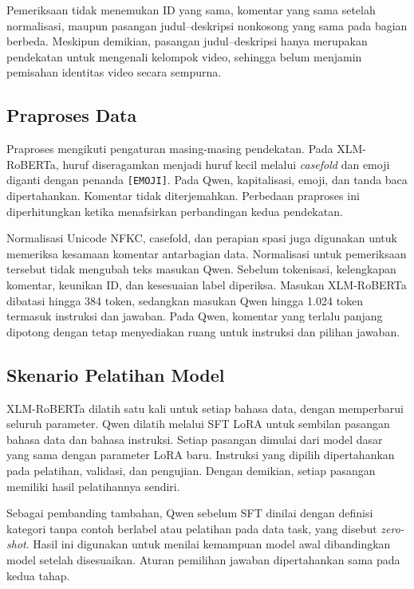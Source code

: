 \documentclass[11pt]{article}
\begin{document}
Pemeriksaan tidak menemukan ID yang sama, komentar yang sama setelah normalisasi, maupun pasangan judul--deskripsi nonkosong yang sama pada bagian berbeda. Meskipun demikian, pasangan judul--deskripsi hanya merupakan pendekatan untuk mengenali kelompok video, sehingga belum menjamin pemisahan identitas video secara sempurna.

\subsection{Praproses Data}
Praproses mengikuti pengaturan masing-masing pendekatan. Pada XLM-RoBERTa, huruf diseragamkan menjadi huruf kecil melalui \textit{casefold} dan emoji diganti dengan penanda \texttt{[EMOJI]}. Pada Qwen, kapitalisasi, emoji, dan tanda baca dipertahankan. Komentar tidak diterjemahkan. Perbedaan praproses ini diperhitungkan ketika menafsirkan perbandingan kedua pendekatan.

Normalisasi Unicode NFKC, casefold, dan perapian spasi juga digunakan untuk memeriksa kesamaan komentar antarbagian data. Normalisasi untuk pemeriksaan tersebut tidak mengubah teks masukan Qwen. Sebelum tokenisasi, kelengkapan komentar, keunikan ID, dan kesesuaian label diperiksa. Masukan XLM-RoBERTa dibatasi hingga 384 token, sedangkan masukan Qwen hingga 1.024 token termasuk instruksi dan jawaban. Pada Qwen, komentar yang terlalu panjang dipotong dengan tetap menyediakan ruang untuk instruksi dan pilihan jawaban.

\subsection{Skenario Pelatihan Model}
XLM-RoBERTa dilatih satu kali untuk setiap bahasa data, dengan memperbarui seluruh parameter. Qwen dilatih melalui SFT LoRA untuk sembilan pasangan bahasa data dan bahasa instruksi. Setiap pasangan dimulai dari model dasar yang sama dengan parameter LoRA baru. Instruksi yang dipilih dipertahankan pada pelatihan, validasi, dan pengujian. Dengan demikian, setiap pasangan memiliki hasil pelatihannya sendiri.

Sebagai pembanding tambahan, Qwen sebelum SFT dinilai dengan definisi kategori tanpa contoh berlabel atau pelatihan pada data task, yang disebut \textit{zero-shot}. Hasil ini digunakan untuk menilai kemampuan model awal dibandingkan model setelah disesuaikan. Aturan pemilihan jawaban dipertahankan sama pada kedua tahap.
\end{document}
